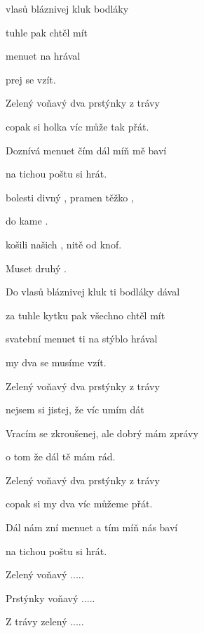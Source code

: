 

\zs
{} vlasů bláznivej kluk  bodláky  

 tuhle  pak  chtěl mít 

 menuet  na  hrával 

 prej se  vzít.  
\ks

\zs
Zelený voňavý dva prstýnky z trávy

copak si holka víc může tak přát.

Doznívá menuet čím dál míň mě baví

na tichou poštu si hrát.
\ks

\zr
{} bolesti divný ,  pramen těžko ,

  do kame .

 košili našich ,  nitě od knof.

  Muset  druhý . 
\kr

\zs
Do vlasů bláznivej kluk ti bodláky dával

za tuhle kytku pak všechno chtěl mít

svatební menuet ti na stýblo hrával

my dva se musíme vzít.
\ks

\zs
Zelený voňavý dva prstýnky z trávy

nejsem si jistej, že víc umím dát

Vracím se zkroušenej, ale dobrý mám zprávy

o tom že dál tě mám rád.
\ks

\zs
Zelený voňavý dva prstýnky z trávy

copak si my dva víc můžeme přát.

Dál nám zní menuet a tím míň nás baví

na tichou poštu si hrát.



Zelený voňavý .....

Prstýnky voňavý .....

Z trávy zelený ..... 
\ks
\kp

